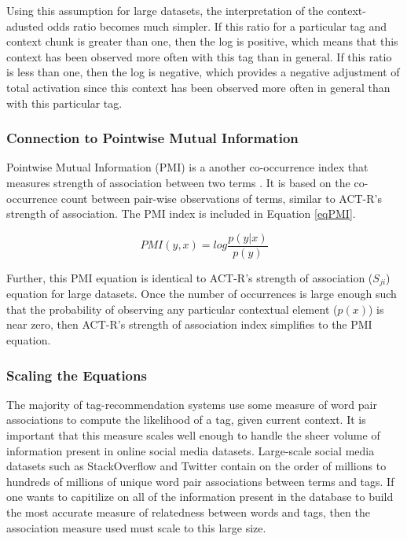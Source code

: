 \documentclass[man,floatsintext]{apa6}
\begin{document}
Using this assumption for large datasets, the interpretation of the context-adusted odds ratio becomes much simpler.
If this ratio for a particular tag and context chunk is greater than one, then the log is positive, which means that this context has been observed more often with this tag than in general.
If this ratio is less than one, then the log is negative, which provides a negative adjustment of total activation since this context has been observed more often in general than with this particular tag.

\subsubsection{Connection to Pointwise Mutual Information}

Pointwise Mutual Information (PMI) is a another co-occurrence index that measures strength of association between two terms \parencite{Farahat2004}.
It is based on the co-occurrence count between pair-wise observations of terms, similar to ACT-R's strength of association.
The PMI index is included in Equation \eqref{eqPMI}.

\begin{equation}
  \label{eqPMI}
  \mathit{PMI}(y,x) = log \frac{p(y|x)}{p(y)}
\end{equation}

Further, this PMI equation is identical to ACT-R's strength of association ($S_{ji}$) equation for large datasets.
Once the number of occurrences is large enough such that the probability of observing any particular contextual element ($p(x)$) is near zero, then ACT-R's strength of association index simplifies to the PMI equation.

\subsubsection{Scaling the Equations}

The majority of tag-recommendation systems use some measure of word pair associations to compute the likelihood of a tag, given current context.
It is important that this measure scales well enough to handle the sheer volume of information present in online social media datasets.
Large-scale social media datasets such as StackOverflow and Twitter contain on the order of millions to hundreds of millions of unique word pair associations between terms and tags.
If one wants to capitilize on all of the information present in the database to build the most accurate measure of relatedness between words and tags, then the association measure used must scale to this large size.
\end{document}
